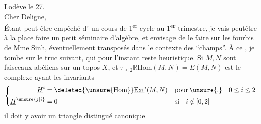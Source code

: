 
\noindent\hfill Lodève le 27.\\
Cher Deligne,\\
Étant peut-être empêché   d' un cours de 1\textsuperscript{er} cycle au 1\textsuperscript{er} trimestre, je vais peutêtre à la place faire un petit séminaire d'algèbre, et envisage de le faire sur les fourbis de Mme Sinh, éventuellement transposés dans le contexte des ``champs''. À ce , je tombe sur le truc suivant, qui pour l'instant reste heuristique. Si $M,N$ sont  faisceaux abéliens sur un topos $X$, et $\tau_{\leq 2}\mathbb{R}\underline{\mathrm{Hom}}(M,N)=E(M,N)$ est le complexe ayant les invariants
\[
\left\{\begin{aligned}
\underline{H}^{i} &= \deleted{\unsure{\mathrm{Hom}}}\underline{\mathrm{Ext}}^{i}(M,N) && \text{pour}\,\unsure{.}\quad 0\leq i\leq 2\\
\underline{H}^{\unsure{j|i}} &= 0 && \text{si}\quad i\notin[0,2]
\end{aligned}\right.
\]
il doit y avoir un triangle distingué canonique

